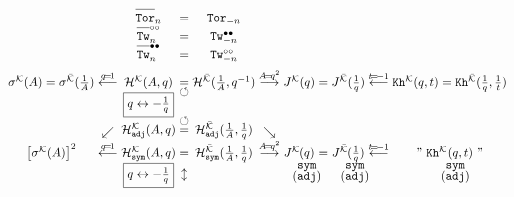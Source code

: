 \documentclass[11pt]{article}
\def\Hm{\mathcal{H}}
\def\Km{\mathcal{K}}
\def\Kh{\mathtt{Kh}}
\def\Tor{\mathtt{Tor}}
\def\Tw{\mathtt{Tw}}
\def\sym{\mathtt{sym}}
\def\adj{\mathtt{adj}}
\begin{document}
\begin{table}
	\caption{Basic properties of the knot polynomials we study\label{tab:pols}.}
	$$
	\arraycolsep=0.5mm
	\begin{array}{ccccccccccccccc}
	&&&&\overline{\rule{0pt}{3mm}\Tor}_n&=&\Tor_{-n}\\
	&&&&\overline{\rule{0pt}{3mm}\Tw}^{\circ\circ}_n&=&\Tw^{\bullet\bullet}_{-n}\\
	&&&&\overline{\rule{0pt}{3mm}\Tw}^{\bullet\bullet}_n&=&\Tw^{\circ\circ}_{-n}
	\\[2mm]
	\sigma^{\Km}(A)&=&\sigma^{\bar{\Km}}(\frac{1}{A})&\stackrel{q\!=\!1}{\longleftarrow}&\Hm^{\Km}(A,q)&=&\Hm^{\bar{\Km}}(\frac{1}{A},q^{-1})&\stackrel{A\!=\!q^2}{\longrightarrow}
	&J^{\Km}(q)&=&J^{\bar{\Km}}(\frac{1}{q})&\stackrel{t\!=\!-1}{\longleftarrow}&\Kh^{\Km}(q,t)&=&\Kh^{\bar{\Km}}(\frac{1}{q},\frac{1}{t})
	\\[-2mm]
	&&&&&\circlearrowleft\\[-2mm]&&&&\boxed{q\leftrightarrow-\textstyle{\frac{1}{q}}}\\[-1mm]&&&&&\circlearrowleft\\[-2mm]
	&&&&\Hm_{\adj}^{\Km}(A,q)&=&\Hm_{\adj}^{\bar{\Km}}(\frac{1}{A},\frac{1}{q})\\[-4mm]
	&&&\swarrow&&&&\searrow\\
	\multicolumn{3}{c}{\big[\sigma^{\Km}(A)\big]^2}&\stackrel{q\!=\!1}{\longleftarrow}&
	\Hm_{\sym}^{\Km}(A,q)&=&\Hm_{\sym}^{\bar{\Km}}(\frac{1}{A},\frac{1}{q})
	&\stackrel{A\!=\!q^2}{\longrightarrow}
	&J_{\begin{array}{c}\\[-3mm]\sym\\[-1mm](\adj)\end{array}}^{\Km}\hspace{-7mm}(q)&=&
	J_{\begin{array}{c}\\[-3mm]\sym\\[-1mm](\adj)\end{array}}^{\bar{\Km}}\hspace{-7mm}(\frac{1}{q})&\stackrel{t\!=\!-1}{\longleftarrow}&
	\multicolumn{3}{c}{"\ \Kh^{\Km}_{\begin{array}{c}\\[-3mm]\sym\\[-1mm](\adj)\end{array}}\hspace{-7mm}(q,t)\ "}\\[-6mm]
	&&&&\boxed{q\leftrightarrow-\textstyle{\frac{1}{q}}}&\updownarrow\\[2mm]

\end{array}$$
\end{table}
\end{document}
